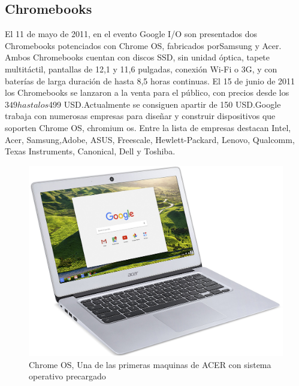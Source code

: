 \documentclass[paper=a4, fontsize=12pt]{article} 		%
\numberwithin{equation}{section}						%
\numberwithin{table}{section} 							%
\begin{document}
\subsection{Chromebooks}
El 11 de mayo de 2011, en el evento Google I/O son presentados dos Chromebooks potenciados con Chrome OS, fabricados porSamsung y Acer. Ambos Chromebooks cuentan con discos SSD, sin unidad óptica, tapete multitáctil, pantallas de 12,1 y 11,6 pulgadas, conexión Wi-Fi o 3G, y con baterías de larga duración de hasta 8,5 horas continuas. El 15 de junio de 2011 los Chromebooks se lanzaron a la venta para el público, con precios desde los $349 hasta los $499 USD.Actualmente se consiguen apartir de 150 USD.Google trabaja con numerosas empresas para diseñar y construir dispositivos que soporten Chrome OS, chromium os. Entre la lista de empresas destacan Intel, Acer, Samsung,Adobe, ASUS, Freescale, Hewlett-Packard, Lenovo, Qualcomm, Texas Instruments, Canonical, Dell y Toshiba.

\begin{center}
\begin{figure}[H]
\includegraphics[scale=0.4]{imgs/qwe_download.jpeg}
\caption{Chrome OS, Una de las primeras maquinas de ACER con sistema operativo precargado}
\label{fig:dis2}
\end{figure}
\end{center}
\end{document}
